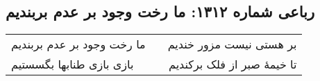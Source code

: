 \begin{center}
\section*{رباعی شماره ۱۳۱۲: ما رخت وجود بر عدم بربندیم}
\label{sec:1312}
\begin{longtable}{l p{0.5cm} r}
ما رخت وجود بر عدم بربندیم
&&
بر هستی نیست مزور خندیم
\\
بازی بازی طنابها بگسستیم
&&
تا خیمهٔ صبر از فلک برکندیم
\\
\end{longtable}
\end{center}
